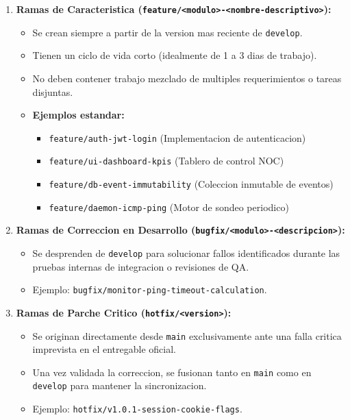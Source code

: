 \documentclass[12pt,a4paper]{report}
\begin{document}
\begin{enumerate}
  \item \textbf{Ramas de Caracteristica (\texttt{feature/<modulo>-<nombre-descriptivo>}):}
  \begin{itemize}
    \item Se crean siempre a partir de la version mas reciente de \texttt{develop}.
    \item Tienen un ciclo de vida corto (idealmente de 1 a 3 dias de trabajo).
    \item No deben contener trabajo mezclado de multiples requerimientos o tareas disjuntas.
    \item \textbf{Ejemplos estandar:}
    \begin{itemize}
      \item \texttt{feature/auth-jwt-login} (Implementacion de autenticacion)
      \item \texttt{feature/ui-dashboard-kpis} (Tablero de control NOC)
      \item \texttt{feature/db-event-immutability} (Coleccion inmutable de eventos)
      \item \texttt{feature/daemon-icmp-ping} (Motor de sondeo periodico)
    \end{itemize}
  \end{itemize}

  \item \textbf{Ramas de Correccion en Desarrollo (\texttt{bugfix/<modulo>-<descripcion>}):}
  \begin{itemize}
    \item Se desprenden de \texttt{develop} para solucionar fallos identificados durante las pruebas internas de integracion o revisiones de QA.
    \item Ejemplo: \texttt{bugfix/monitor-ping-timeout-calculation}.
  \end{itemize}

  \item \textbf{Ramas de Parche Critico (\texttt{hotfix/<version>}):}
  \begin{itemize}
    \item Se originan directamente desde \texttt{main} exclusivamente ante una falla critica imprevista en el entregable oficial.
    \item Una vez validada la correccion, se fusionan tanto en \texttt{main} como en \texttt{develop} para mantener la sincronizacion.
    \item Ejemplo: \texttt{hotfix/v1.0.1-session-cookie-flags}.
  \end{itemize}
\end{enumerate}
\end{document}
